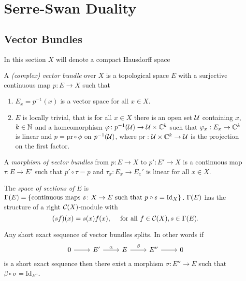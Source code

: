 \section{Serre-Swan Duality}
\subsection{Vector Bundles}
In this section $X$ will denote a compact Hausdorff space
\begin{definition}
 A \emph{(complex) vector bundle} over $X$ is a topological space $E$ with a surjective continuous map $p\colon E\to X$ such that
 \begin{enumerate}
  \item $E_x=p^{-1}(x)$ is a vector space for all $x\in X$.
  \item $E$ is locally trivial, that is for all $x\in X$ there is an open set $\mathcal{U}$ containing $x$, $k\in\mathbb{N}$ and a homeomorphism $\varphi\colon p^{-1}(\mathcal{U})\to\mathcal{U}\times\mathbb{C}^k$ such that $\varphi_x:E_x\to\mathbb{C}^k$ is linear and $p=\mathrm{pr}\circ\phi$ on $p^{-1}(\mathcal{U})$, where $\mathrm{pr}:\mathcal{U}\times\mathbb{C}^k\to\mathcal{U}$ is the projection on the first factor.
 \end{enumerate}
\end{definition}

\begin{definition}
 A \emph{morphism of vector bundles} from $p\colon E\to X$ to $p'\colon E'\to X$ is a continuous map $\tau\colon E\to E'$ such that $p'\circ\tau=p$ and $\tau_x:E_x\to E_x'$ is linear for all $x\in X$.
\end{definition}

\begin{definition}\label{def: Gamma}
 The \emph{space of sections of $E$} is $\Gamma(E)=\{\text{continuous maps $s\colon X\to E$ such that $p\circ s=\mathrm{Id}_X$}\}$.
 $\Gamma(E)$ has the structure of a right $\mathcal{C}(X)$-module with $$(sf)(x)=s(x)f(x),\quad\text{ for all }f\in\mathcal{C}(X),s\in\Gamma(E).$$
\end{definition}

\begin{lemma}\label{lemma: split}
 Any short exact sequence of vector bundles splits. In other words if $$\begin{tikzcd}0\arrow[r] & E'\arrow["\alpha",r] & E \arrow["\beta",r] & E''\arrow[r] & 0 \end{tikzcd}$$ is a short exact sequence then there exist a morphism $\sigma\colon E''\to E$ such that $\beta\circ\sigma=\mathrm{Id}_{E''}$. 
\end{lemma}

